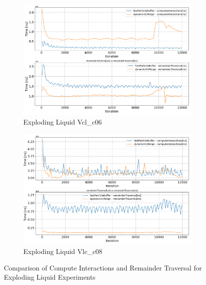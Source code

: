 \begin{figure}[htbp]
    \centering
    \vspace{-0.5em}
    \begin{subfigure}[b]{\textwidth}
        \centering
        \includegraphics[width=0.9\linewidth]{graphs/explodingLiquid/normalExperiments/freq/vclc0_6inter.png}
        \vspace{-0.5em}
        \caption{\scriptsize Exploding Liquid Vcl\_c06}
        \label{fig:explodingLiquid_vclc0_6inter}
    \end{subfigure}

    \begin{subfigure}[b]{\textwidth}
        \centering
        \includegraphics[width=0.9\linewidth]{graphs/explodingLiquid/normalExperiments/freq/vlc_c08inter.png}
        \vspace{-0.5em}
        \caption{\scriptsize Exploding Liquid Vlc\_c08}
        \label{fig:explodingLiquid_vlc_c08inter}
    \end{subfigure}

    \vspace{1em}
    \caption{Comparison of Compute Interactions and Remainder Traversal for Exploding Liquid Experiments}
    \label{fig:mainexplodingLiquid_inter}
\end{figure}


